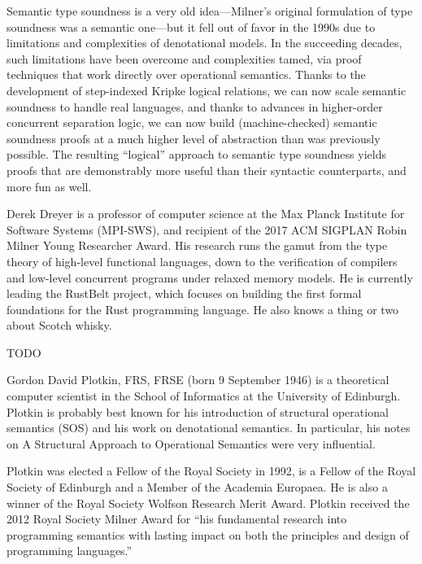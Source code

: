 Semantic type soundness is a very old idea—Milner’s original formulation of type
soundness was a semantic one—but it fell out of favor in the 1990s due to
limitations and complexities of denotational models. In the succeeding decades,
such limitations have been overcome and complexities tamed, via proof techniques
that work directly over operational semantics. Thanks to the development of
step-indexed Kripke logical relations, we can now scale semantic soundness to
handle real languages, and thanks to advances in higher-order concurrent
separation logic, we can now build (machine-checked) semantic soundness proofs
at a much higher level of abstraction than was previously possible. The
resulting ``logical'' approach to semantic type soundness yields proofs that are
demonstrably more useful than their syntactic counterparts, and more fun as
well.

\bio
Derek Dreyer is a professor of computer science at the Max Planck Institute for
Software Systems (MPI-SWS), and recipient of the 2017 ACM SIGPLAN Robin Milner
Young Researcher Award.  His research runs the gamut from the type theory of
high-level functional languages, down to the verification of compilers and
low-level concurrent programs under relaxed memory models.  He is currently
leading the RustBelt project, which focuses on building the first formal
foundations for the Rust programming language.  He also knows a thing or two
about Scotch whisky.

\medskip



\talkabstract
TODO

\bio
Gordon David Plotkin, FRS, FRSE (born 9 September 1946) is a theoretical
computer scientist in the School of Informatics at the University of Edinburgh.
Plotkin is probably best known for his introduction of structural operational
semantics (SOS) and his work on denotational semantics. In particular, his notes
on A Structural Approach to Operational Semantics were very influential.

Plotkin was elected a Fellow of the Royal Society in 1992, is a Fellow of the
Royal Society of Edinburgh and a Member of the Academia Europaea. He is also a
winner of the Royal Society Wolfson Research Merit Award. Plotkin received the
2012 Royal Society Milner Award for ``his fundamental research into programming
semantics with lasting impact on both the principles and design of programming
languages.''

